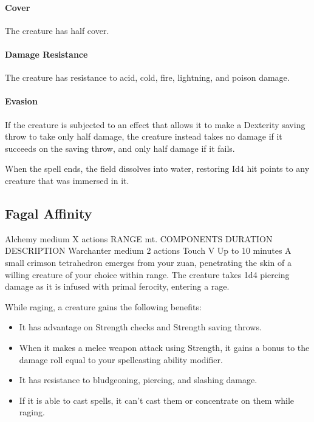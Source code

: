         \paragraph{Cover}
        The creature has half cover.
        \paragraph{Damage Resistance}
        The creature has resistance to acid, cold, fire, lightning, and poison damage.
        \paragraph{Evasion}
        If the creature is subjected to an effect that allows it to make a Dexterity saving throw to take only half damage, the creature instead takes no damage if it succeeds on the saving throw, and only half damage if it fails.

        When the spell ends, the field dissolves into water, restoring Id4 hit points to any creature that was immersed in it.
\subsection*{Fagal Affinity}
        {Alchemy medium}
        {X actions}
        {RANGE mt.}
        {COMPONENTS}
        {DURATION}
        DESCRIPTION
        {Warchanter medium}
        {2 actions}
        {Touch}
        {V}
        {Up to 10 minutes}
        A small crimson tetrahedron emerges from your zuan, penetrating the skin of a willing creature of your choice within range.
        The creature takes 1d4 piercing damage as it is infused with primal ferocity, entering a rage.

        While raging, a creature gains the following benefits:
        \begin{itemize}
            \item It has advantage on Strength checks and Strength saving throws.
            \item When it makes a melee weapon attack using Strength, it gains a bonus to the damage roll equal to your spellcasting ability modifier.
            \item It has resistance to bludgeoning, piercing, and slashing damage.
            \item If it is able to cast spells, it can't cast them or concentrate on them while raging.
        \end{itemize}

